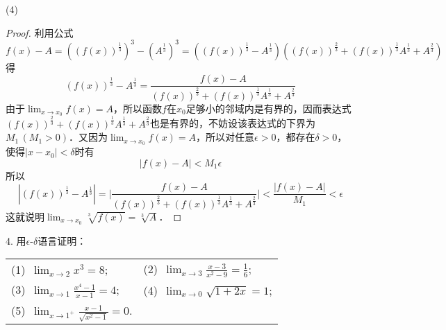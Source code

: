 (4)
\begin{proof}
利用公式
\begin{equation}
    f(x) - A = ((f(x))^\frac{1}{3})^3 - (A^\frac{1}{3})^3 = ((f(x))^\frac{1}{3}-A^\frac{1}{3})((f(x))^{\frac{2}{3}} + (f(x))^\frac{1}{3} A^\frac{1}{3} + A^\frac{2}{3})
\end{equation}
得
\begin{equation}
    (f(x))^\frac{1}{3}-A^\frac{1}{3} = \frac{f(x) - A}{(f(x))^{\frac{2}{3}} + (f(x))^\frac{1}{3} A^\frac{1}{3} + A^\frac{2}{3}}
\end{equation}
由于$\displaystyle\lim_{x \to x_0} f(x) = A$，所以函数$f$在$x_0$足够小的邻域内是有界的，因而表达式$(f(x))^{\frac{2}{3}} + (f(x))^\frac{1}{3} A^\frac{1}{3} + A^\frac{2}{3}$也是有界的，不妨设该表达式的下界为$M_1 \, (M_1 > 0)$．又因为$\displaystyle\lim_{x \to x_0} f(x) = A$，所以对任意$\epsilon > 0$，都存在$\delta > 0$，使得$|x - x_0| < \delta$时有
\begin{equation}
    |f(x) - A| < M_1 \epsilon
\end{equation}
所以
\begin{equation}
    |(f(x))^\frac{1}{3}-A^\frac{1}{3}| = \bigg\lvert \frac{f(x) - A}{(f(x))^{\frac{2}{3}} + (f(x))^\frac{1}{3} A^\frac{1}{3} + A^\frac{2}{3}} \bigg\rvert < \frac{|f(x)-A|}{M_1} < \epsilon
\end{equation}
这就说明$\displaystyle\lim_{x \to x_0} \sqrt[3]{f(x)} = \sqrt[3]{A}$．
\end{proof}

4. 用$\epsilon$-$\delta$语言证明：
\begin{table}[H]
    \centering
    \begin{tabularx}{0.8\textwidth} {  >{\raggedright\arraybackslash}X >{\raggedright\arraybackslash}X  }
       (1)~$\displaystyle\lim_{x \to 2} x^3 = 8$; & (2)~$\displaystyle\lim_{x \to 3} \frac{x-3}{x^2-9} = \frac{1}{6}$; \\ [1em]
       (3)~$\displaystyle\lim_{x \to 1} \displaystyle\frac{x^4-1}{x-1} = 4$; & (4)~$\displaystyle\lim_{x \to 0} \sqrt{1+2x} = 1$; \\ [1em]
       (5)~$\displaystyle\lim_{x \to 1^{+}} \displaystyle\frac{x-1}{\sqrt{x^2-1}} = 0$.
      \end{tabularx}
\end{table}

